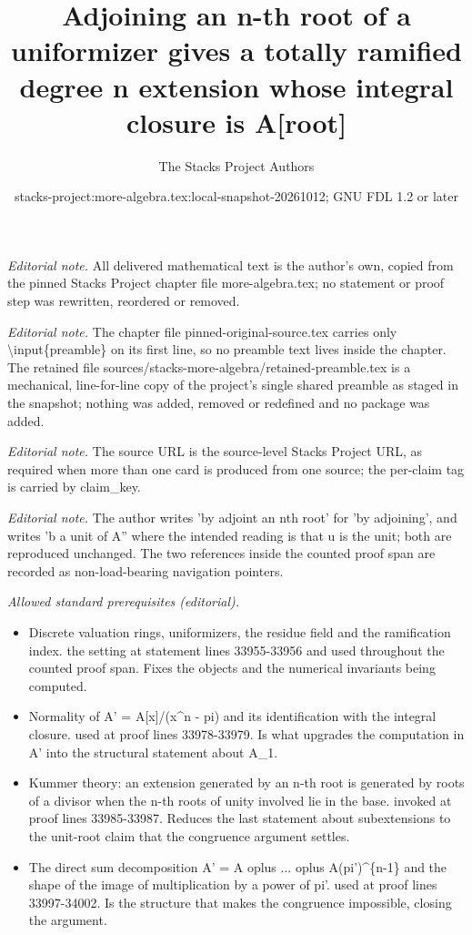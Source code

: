 \documentclass[10pt,a4paper]{amsart}
\title{Adjoining an n-th root of a uniformizer gives a totally ramified degree n extension whose integral closure is A[root]}
\author{The Stacks Project Authors}
\date{stacks-project:more-algebra.tex:local-snapshot-20261012; GNU FDL 1.2 or later}
\theoremstyle{plain}
\theoremstyle{definition}
\theoremstyle{remark}
\numberwithin{equation}{subsection}
\begin{document}
\maketitle
\setcounter{subsection}{1}
\noindent\textit{Editorial note.} All delivered mathematical text is the author's own, copied from the pinned Stacks Project chapter file more-algebra.tex; no statement or proof step was rewritten, reordered or removed.\par\medskip
\noindent\textit{Editorial note.} The chapter file pinned-original-source.tex carries only \textbackslash{}input\{preamble\} on its first line, so no preamble text lives inside the chapter. The retained file sources/stacks-more-algebra/retained-preamble.tex is a mechanical, line-for-line copy of the project's single shared preamble as staged in the snapshot; nothing was added, removed or redefined and no package was added.\par\medskip
\noindent\textit{Editorial note.} The source URL is the source-level Stacks Project URL, as required when more than one card is produced from one source; the per-claim tag is carried by claim\_key.\par\medskip
\noindent\textit{Editorial note.} The author writes 'by adjoint an nth root' for 'by adjoining', and writes 'b a unit of A'' where the intended reading is that u is the unit; both are reproduced unchanged. The two references inside the counted proof span are recorded as non-load-bearing navigation pointers.\par\medskip
\noindent\textit{Allowed standard prerequisites (editorial).}\begin{itemize}
\item Discrete valuation rings, uniformizers, the residue field and the ramification index. the setting at statement lines 33955-33956 and used throughout the counted proof span. Fixes the objects and the numerical invariants being computed.
\item Normality of A' = A[x]/(x\textasciicircum{}n - pi) and its identification with the integral closure. used at proof lines 33978-33979. Is what upgrades the computation in A' into the structural statement about A\_1.
\item Kummer theory: an extension generated by an n-th root is generated by roots of a divisor when the n-th roots of unity involved lie in the base. invoked at proof lines 33985-33987. Reduces the last statement about subextensions to the unit-root claim that the congruence argument settles.
\item The direct sum decomposition A' = A oplus ... oplus A(pi')\textasciicircum{}\{n-1\} and the shape of the image of multiplication by a power of pi'. used at proof lines 33997-34002. Is the structure that makes the congruence impossible, closing the argument.
\end{itemize}\medskip
\end{document}
